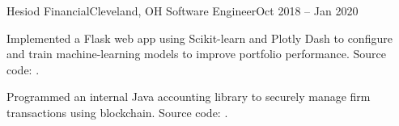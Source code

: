 \begin{ritemize}
	{Hesiod Financial}{Cleveland, OH}
	{Software Engineer}{Oct 2018 -- Jan 2020}
	\item Implemented a Flask web app using Scikit-learn and Plotly Dash to configure and train machine-learning models to improve portfolio performance. Source code: .
	\item Programmed an internal Java accounting library to securely manage firm transactions using blockchain. Source code: .
\end{ritemize}